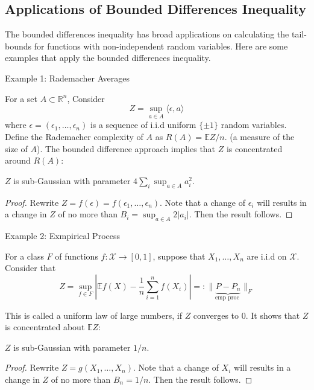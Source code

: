 \subsection{Applications of Bounded Differences Inequality}
The bounded differences inequality has broad applications on  calculating the tail-bounds for functions with non-independent random variables. Here are some examples that apply the bounded differences inequality.

Example 1: Rademacher Averages \cite*{Bartlett:2020}

For a set $A \subset \mathbb{R}^n$, Consider
\begin{equation}
  Z=\sup _{a \in A}\langle\epsilon, a\rangle
\end{equation}
where $\epsilon = (\epsilon_1, \dots, \epsilon_n)$ is a sequence of i.i.d uniform $\{ \pm 1 \}$ random variables. 
Define the Rademacher complexity of $A$ as $R(A) = \mathbb{E}Z/n$. (a measure of the size of $A$). 
The bounded difference approach implies that $Z$ is concentrated around $R(A)$:
  \begin{theorem}
    $Z$ is sub-Gaussian with parameter $4\sum_i \sup_{a \in A} a_{i}^2$.
  \end{theorem}

  \begin{proof}
    Rewrite $Z = f(\epsilon) = f(\epsilon_1, \dots, \epsilon_n)$. 
    Note that a change of $\epsilon_i$ will results in a change in $Z$ of no more than $B_i = \sup_{a \in A} 2 \left| a_i \right|$.
    Then the result follows.
  \end{proof}

Example 2: Exmpirical Process \cite*{Bartlett:2020}

For a class $F$ of functions $f: \mathcal{X} \rightarrow [0,1]$, suppose that $X_1, \dots, X_n $ are i.i.d on $\mathcal{X}$.
Consider that 
\begin{equation}
  Z=\sup _{f \in F}\left|\mathbb{E} f(X)-\frac{1}{n} \sum_{i=1}^{n} f\left(X_{i}\right)\right|=:\|\underbrace{P-P_{n}}_{\text {emp proc }}\|_{F}
\end{equation}

This is called a uniform law of large numbers, if $Z$ converges to 0.
It shows that $Z$ is concentrated about $\mathbb{E}Z$:

\begin{theorem}
  $Z$ is sub-Gaussian with parameter $1/n$.
\end{theorem}

\begin{proof}
  Rewrite $Z = g(X_1, \dots, X_n)$. Note that a change of $X_i$ will results in a change in $Z$ of no more than $B_n = 1/n$.
  Then the result follows.
\end{proof}

